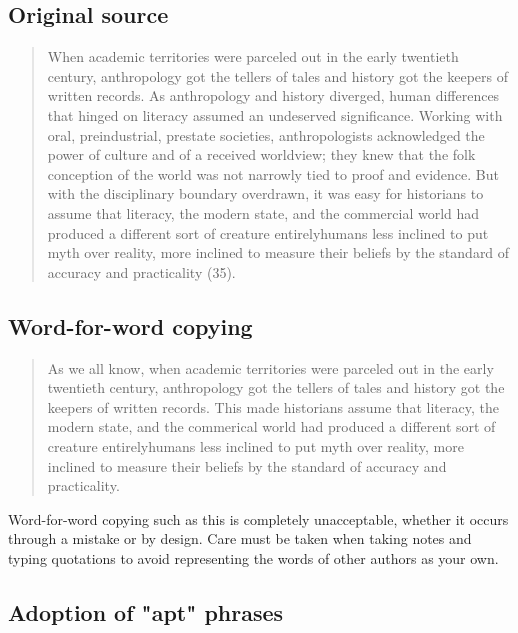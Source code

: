\subsection{Original source}

\begin{quote}
When academic territories were parceled out in the early twentieth century, anthropology got the tellers of tales and history got the keepers of written records.  As anthropology and history diverged, human differences that hinged on literacy assumed an undeserved significance.  Working with oral, preindustrial, prestate societies, anthropologists acknowledged the power of culture and of a received worldview; they knew that the folk conception of the world was not narrowly tied to proof and evidence.  But with the disciplinary boundary overdrawn, it was easy for historians to assume that literacy, the modern state, and the commercial world had produced a different sort of creature entirely\textemdash humans less inclined to put myth over reality, more inclined to measure their beliefs by the standard of accuracy and practicality (35).
\end{quote}

\subsection{Word-for-word copying}

\begin{Spacing}{1.5}
\begin{quote}
As we all know, when academic territories were parceled out in the early twentieth century, anthropology got the tellers of tales and history got the keepers of written records. This made historians assume that literacy, the modern state, and the commerical world had produced a different sort of creature entirely\textemdash humans less inclined to put myth over reality, more inclined to measure their beliefs by the standard of accuracy and practicality. 
\end{quote} 

\end{Spacing}

 Word-for-word copying such as this is completely unacceptable, whether it occurs through a mistake or by design. Care must be taken when taking notes and typing quotations to avoid representing the words of other authors as your own. 

\subsection{Adoption of "apt" phrases}

